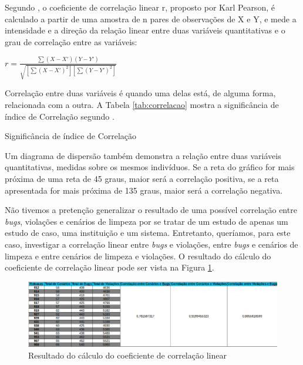 Segundo \cite{Wasserman2010}, o coeficiente de correlação linear r, proposto por Karl Pearson, é calculado a partir de uma amostra de n pares de observações de X e Y, e mede a intensidade e a direção da relação linear entre duas variáveis quantitativas e o grau de correlação entre as variáveis:

$ r = \frac{\sum(X-X')(Y-Y')}{\sqrt{[\sum(X-X')^{2}][\sum(Y-Y')^{2}]}} $


Correlação entre duas variáveis é quando uma delas está, de alguma forma, relacionada com a outra. A Tabela \ref{tab:correlacao} mostra a significância de índice de Correlação segundo \cite{Wasserman2010}.

\begin{table}[!ht]
	\begin{center}
 
	\caption{Significância de índice de Correlação}
	\label{tab:correlacao}
	\end{center}
	\end{table}	
	\FloatBarrier

Um diagrama de dispersão também demonstra a relação entre duas variáveis quantitativas, medidas sobre os mesmos indivíduos. Se a reta do gráfico for mais próxima de
uma reta de 45 graus, maior será a correlação positiva, se a reta apresentada for mais próxima de 135 graus, maior será a correlação negativa. 

Não tivemos a pretenção generalizar o resultado de uma possível correlação entre \textit{bugs}, violações e cenários de limpeza por se tratar de um estudo de apenas um estudo de caso, uma instituição e um sistema. Entretanto, queríamos, para este caso, investigar a  correlação linear entre \textit{bugs} e violações, entre \textit{bugs} e cenários de limpeza e entre cenários de limpeza e violações. O resultado do cálculo do coeficiente de correlação linear pode ser vista na Figura \ref{correlacao}.

\begin{figure}[H]
\centering
\includegraphics[keepaspectratio=false,scale=0.40,angle=90]{figuras/figuras_nilton/correlacao.eps}
\caption{Resultado do cálculo do coeficiente de correlação linear}
\label{correlacao}
\end{figure}


